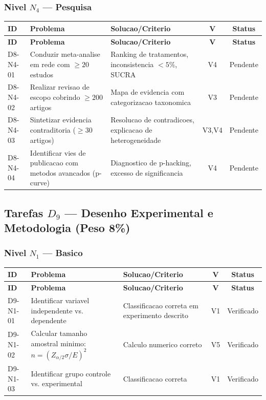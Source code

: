 \subsubsection{Nivel $N_4$ --- Pesquisa}

\begin{longtable}{|p{2.0cm}|p{4.2cm}|p{4.2cm}|c|c|}
\hline
\textbf{ID} & \textbf{Problema} & \textbf{Solucao/Criterio} & \textbf{V} & \textbf{Status} \\
\hline
\endfirsthead
\hline
\textbf{ID} & \textbf{Problema} & \textbf{Solucao/Criterio} & \textbf{V} & \textbf{Status} \\
\hline
\endhead
\hline
\endfoot
D8-N4-01 & Conduzir meta-analise em rede com $\geq 20$ estudos & Ranking de tratamentos, inconsistencia $<5\%$, SUCRA & V4 & Pendente \\
\hline
D8-N4-02 & Realizar revisao de escopo cobrindo $\geq 200$ artigos & Mapa de evidencia com categorizacao taxonomica & V3 & Pendente \\
\hline
D8-N4-03 & Sintetizar evidencia contraditoria ($\geq 30$ artigos) & Resolucao de contradicoes, explicacao de heterogeneidade & V3,V4 & Pendente \\
\hline
D8-N4-04 & Identificar vies de publicacao com metodos avancados (p-curve) & Diagnostico de p-hacking, excesso de significancia & V4 & Pendente \\
\hline
\end{longtable}

\subsection{Tarefas $D_9$ --- Desenho Experimental e Metodologia (Peso 8\%)}

\subsubsection{Nivel $N_1$ --- Basico}

\begin{longtable}{|p{2.0cm}|p{4.2cm}|p{4.2cm}|c|c|}
\hline
\textbf{ID} & \textbf{Problema} & \textbf{Solucao/Criterio} & \textbf{V} & \textbf{Status} \\
\hline
\endfirsthead
\hline
\textbf{ID} & \textbf{Problema} & \textbf{Solucao/Criterio} & \textbf{V} & \textbf{Status} \\
\hline
\endhead
\hline
\endfoot
D9-N1-01 & Identificar variavel independente vs. dependente & Classificacao correta em experimento descrito & V1 & Verificado \\
\hline
D9-N1-02 & Calcular tamanho amostral minimo: $n=(Z_{\alpha/2}\sigma/E)^{2}$ & Calculo numerico correto & V5 & Verificado \\
\hline
D9-N1-03 & Identificar grupo controle vs. experimental & Classificacao correta & V1 & Verificado \\
\hline
\end{longtable}

